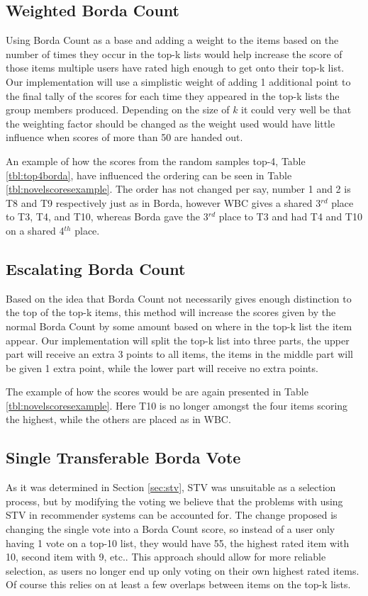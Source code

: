 \subsection{Weighted Borda Count}
Using Borda Count as a base and adding a weight to the items based on the number of times they occur in the top-k lists would help increase the score of those items multiple users have rated high enough to get onto their top-k list. Our implementation will use a simplistic weight of adding 1 additional point to the final tally of the scores for each time they appeared in the top-k lists the group members produced. Depending on the size of $k$ it could very well be that the weighting factor should be changed as the weight used would have little influence when scores of more than 50 are handed out.

An example of how the scores from the random samples top-4, Table \ref{tbl:top4borda}, have influenced the ordering can be seen in Table \ref{tbl:novelscoresexample}. The order has not changed per say, number 1 and 2 is T8 and T9 respectively just as in Borda, however WBC gives a shared 3$^{rd}$ place to T3, T4, and T10, whereas Borda gave the 3$^{rd}$ place to T3 and had T4 and T10 on a shared 4$^{th}$ place. 

\subsection{Escalating Borda Count}
Based on the idea that Borda Count not necessarily gives enough distinction to the top of the top-k items, this method will increase the scores given by the normal Borda Count by some amount based on where in the top-k list the item appear. Our implementation will split the top-k list into three parts, the upper part will receive an extra 3 points to all items, the items in the middle part will be given 1 extra point, while the lower part will receive no extra points.

The example of how the scores would be are again presented in Table \ref{tbl:novelscoresexample}. Here T10 is no longer amongst the four items scoring the highest, while the others are placed as in WBC.

\subsection{Single Transferable Borda Vote} \label{STBV}
As it was determined in Section \ref{sec:stv}, STV was unsuitable as a selection process, but by modifying the voting we believe that the problems with using STV in recommender systems can be accounted for. The change proposed is changing the single vote into a Borda Count score, so instead of a user only having 1 vote on a top-10 list, they would have 55, the highest rated item with 10, second item with 9, etc.. This approach should allow for more reliable selection, as users no longer end up only voting on their own highest rated items. Of course this relies on at least a few overlaps between items on the top-k lists.\\

